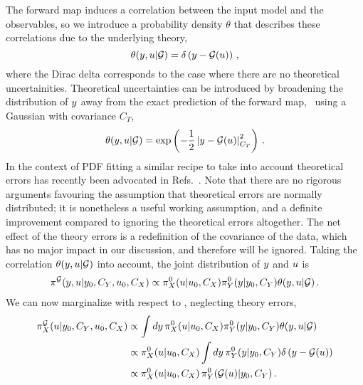 The forward map induces a correlation between the input model and the
observables, so we introduce a probability density $\theta$ that describes these
correlations due to the underlying theory,  
\begin{equation}
  \label{eq:ThetaCorr}
  \theta(y,u|\mathcal{G}) = \delta\left(y - \mathcal{G}(u)\right)\, ,
\end{equation}
where the Dirac delta corresponds to the case where there are no theoretical
uncertainities. Theoretical uncertainties can be introduced by broadening the
distribution of $y$ away from the exact prediction of the forward map, \eg\
using a Gaussian with covariance $C_T$,
\begin{equation}
  \label{eq:TheoryErrors}
  \theta(y,u|\mathcal{G}) = \exp\left(
    -\frac12 
    \left| y - \mathcal{G}(u)
    \right|_{C_T}^2\right)\, .
\end{equation}
In the context of PDF fitting a similar recipe to take into account theoretical
errors has recently been advocated in
Refs.~\cite{NNPDF:2019vjt,AbdulKhalek:2019ihb}. Note that there are no rigorous
arguments favouring the assumption that theoretical errors are normally
distributed; it is nonetheless a useful working assumption, and a definite
improvement compared to ignoring the theoretical errors altogether. The net
effect of the theory errors is a redefinition of the covariance of the data,
which has no major impact in our discussion, and therefore will be ignored.
Taking the correlation $\theta(y,u|\mathcal{G})$ into account, the
joint distribution of $y$ and $u$ is
\begin{align}
  \label{eq:JointYAndU}
  \pi^{\mathcal{G}}(y,u|y_0,C_{Y},u_0,C_X) 
  \propto 
  \pi_{X}^0(u|u_0, C_X) 
  \pi_{Y}^0(y|y_0,C_{Y}) 
  \theta(y,u|\mathcal{G})\, .
\end{align}
We can now marginalize with respect to \obs, neglecting theory errors, 
\begin{align}
  \label{eq:MarginOne}
  \pi^{\mathcal{G}}_{X}(u|y_0,C_{Y},u_0,C_X) 
  &\propto \int dy\, 
    \pi_{X}^0(u|u_0,C_X) 
    \pi_{Y}^0(y|y_0,C_{Y}) 
    \theta(y,u|\mathcal{G}) \\
  & \propto \pi_{X}^0(u|u_0,C_X)  
    \int dy\, 
    \pi_{Y}^0(y|y_0,C_{Y}) 
    \delta\left(y-\mathcal{G}(u)\right) \\
  & \propto 
    \pi_{X}^0(u|u_0,C_X) \,
    \pi_{Y}^0(\mathcal{G}(u)|y_0,C_{Y})\, .
\end{align}
